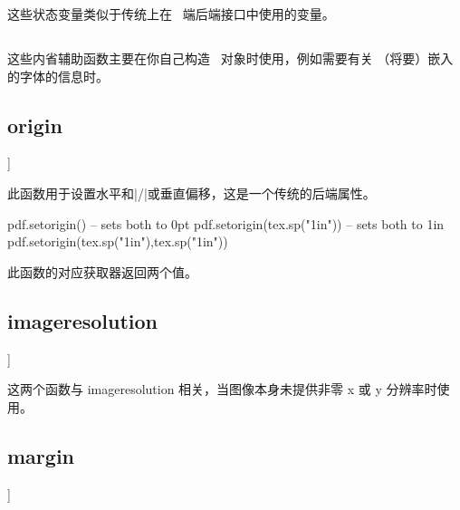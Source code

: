 这些状态变量类似于传统上在 \TEX\ 端后端接口中使用的变量。

\subsection{}


这些内省辅助函数主要在你自己构造 \PDF\ 对象时使用，例如需要有关
（将要）嵌入的字体的信息时。

\subsection{{\type {[set|get}origin}}]


 

此函数用于设置水平和|/|或垂直偏移，这是一个传统的后端属性。

\begin{typing}
pdf.setorigin() -- sets both to 0pt
pdf.setorigin(tex.sp("1in")) -- sets both to 1in
pdf.setorigin(tex.sp("1in"),tex.sp("1in"))
\end{typing}

此函数的对应获取器返回两个值。

\subsection{{\type {[set|get}imageresolution}}]


 

这两个函数与 imageresolution 相关，当图像本身未提供非零 x 或 y 分辨率时使用。

\subsection{{\type {[set|get}margin}}]


   
   
 
  
 

